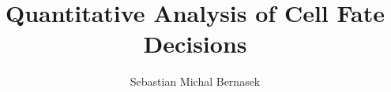 \documentclass[12pt,reqno]{nuthesis}	%
\author{Sebastian Michal Bernasek}
\title{Quantitative Analysis of Cell Fate Decisions}
\begin{document}
\frontmatter		
\maketitle		
\copyrightpage	

\abstract       


\acknowledgements


\clearpage{}
\tableofcontents	

\clearpage{}
\listoffigures

\clearpage{} 
\listoftables	

\mainmatter     






\begin{singlespace}
\bibsep 10pt


\end{singlespace}

\appendix

\end{document}
